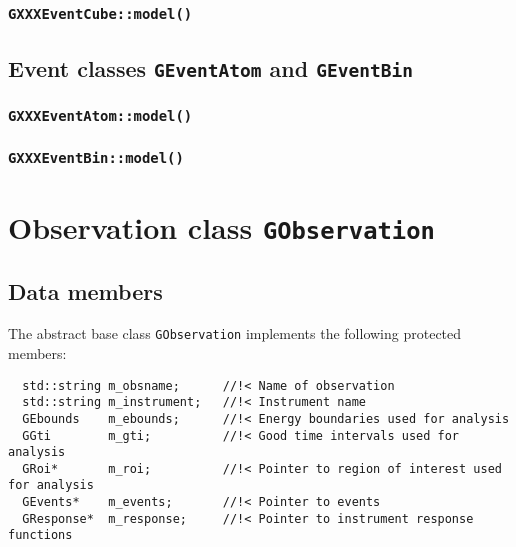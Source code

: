 \documentclass{article}[12pt,a4]
\begin{document}
\subsubsection{{\tt GXXXEventCube::model()}}

\subsection{Event classes {\tt GEventAtom} and {\tt GEventBin}}
\label{sec:GEvent}


\subsubsection{{\tt GXXXEventAtom::model()}}

\subsubsection{{\tt GXXXEventBin::model()}}



\section{Observation class {\tt GObservation}}
\label{sec:GObservation}

\subsection{Data members}

The abstract base class {\tt GObservation} implements the following protected members:

\begin{verbatim}
  std::string m_obsname;      //!< Name of observation
  std::string m_instrument;   //!< Instrument name
  GEbounds    m_ebounds;      //!< Energy boundaries used for analysis
  GGti        m_gti;          //!< Good time intervals used for analysis
  GRoi*       m_roi;          //!< Pointer to region of interest used for analysis
  GEvents*    m_events;       //!< Pointer to events
  GResponse*  m_response;     //!< Pointer to instrument response functions
\end{verbatim}
\end{document}
